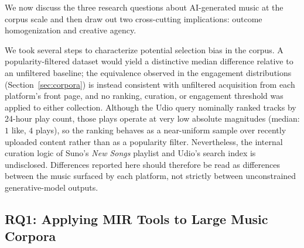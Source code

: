 \documentclass{article}
\newcommand{\rev}[1]{{\color{r2}#1}} %
\begin{document}
We now discuss the three research questions about AI-generated music at the corpus scale and then draw out two cross-cutting implications: outcome homogenization and creative agency. %

\rev{We took several steps to characterize potential selection bias in the corpus. A popularity-filtered dataset would yield a distinctive median difference relative to an unfiltered baseline; the equivalence observed in the engagement distributions (Section~\ref{sec:corpora}) is instead consistent with unfiltered acquisition from each platform's front page, and no ranking, curation, or engagement threshold was applied to either collection. Although the Udio query nominally ranked tracks by 24-hour play count, those plays operate at very low absolute magnitudes (median: $1$ like, $4$ plays), so the ranking behaves as a near-uniform sample over recently uploaded content rather than as a popularity filter. Nevertheless, the} internal curation logic of Suno's \textit{New Songs} playlist and Udio's search index is undisclosed. Differences reported here should therefore be read as differences between the music surfaced by each platform, not strictly between unconstrained generative-model outputs.


\subsection{RQ1: Applying MIR Tools to Large Music Corpora}
\label{sec:disc_mir}
\end{document}
